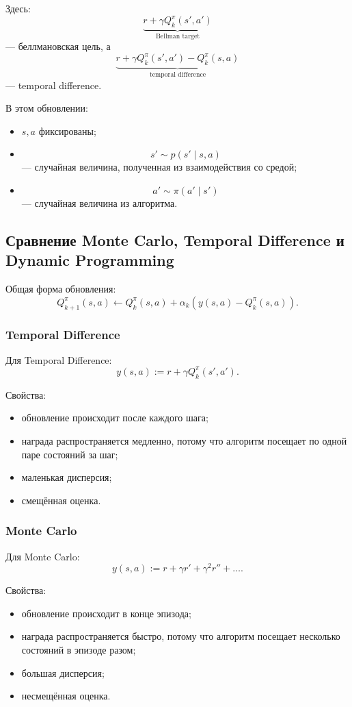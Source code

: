 \documentclass[12pt,a4paper]{article}
\begin{document}
Здесь:
\[
\underbrace{
r+\gamma Q_k^\pi(s',a')
}_{\text{Bellman target}}
\]
--- беллмановская цель, а
\[
\underbrace{
r+\gamma Q_k^\pi(s',a')-Q_k^\pi(s,a)
}_{\text{temporal difference}}
\]
--- temporal difference.

В этом обновлении:
\begin{itemize}
    \item $s,a$ фиксированы;
    \item
    \[
    s' \sim p(s'\mid s,a)
    \]
    --- случайная величина, полученная из взаимодействия со средой;
    \item
    \[
    a' \sim \pi(a'\mid s')
    \]
    --- случайная величина из алгоритма.
\end{itemize}

\subsection{Сравнение Monte Carlo, Temporal Difference и Dynamic Programming}

Общая форма обновления:
\[
Q_{k+1}^\pi(s,a)
\leftarrow
Q_k^\pi(s,a)
+
\alpha_k
\left(
y(s,a)
-
Q_k^\pi(s,a)
\right).
\]

\subsubsection{Temporal Difference}

Для Temporal Difference:
\[
y(s,a)
:=
r+\gamma Q_k^\pi(s',a').
\]

Свойства:
\begin{itemize}
    \item обновление происходит после каждого шага;
    \item награда распространяется медленно, потому что алгоритм посещает по одной паре состояний за шаг;
    \item маленькая дисперсия;
    \item смещённая оценка.
\end{itemize}

\subsubsection{Monte Carlo}

Для Monte Carlo:
\[
y(s,a)
:=
r+\gamma r'
+
\gamma^2 r''
+
\ldots.
\]

Свойства:
\begin{itemize}
    \item обновление происходит в конце эпизода;
    \item награда распространяется быстро, потому что алгоритм посещает несколько состояний в эпизоде разом;
    \item большая дисперсия;
    \item несмещённая оценка.
\end{itemize}
\end{document}
